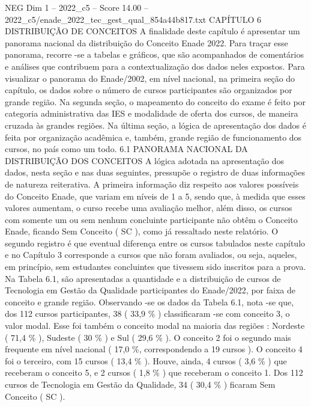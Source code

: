 \begin{textsample}{NEG Dim 1 – 2022\_c5 – Score 14.00 – 2022\_c5/enade\_2022\_tec\_gest\_qual\_854a44b817.txt}  \label{ex:f1_neg_413}
CAPÍTULO 6 DISTRIBUIÇÃO DE CONCEITOS A finalidade deste capítulo é apresentar um panorama nacional da distribuição do Conceito Enade 2022.
Para traçar esse panorama, recorre -se a tabelas e gráficos, que são acompanhados de comentários e análises que contribuem para a contextualização dos dados neles expostos.
Para visualizar o panorama do Enade/2002, em nível nacional, na primeira seção do capítulo, os dados sobre o número de cursos participantes são organizados por grande região.
Na segunda seção, o mapeamento do conceito do exame é feito por categoria administrativa das IES e modalidade de oferta dos cursos, de maneira cruzada às grandes regiões.
Na última seção, a lógica de apresentação dos dados é feita por organização acadêmica e, também, grande região de funcionamento dos cursos, no país como um todo. 6.1 PANORAMA NACIONAL DA DISTRIBUIÇÃO DOS CONCEITOS A lógica adotada na apresentação dos dados, nesta seção e nas duas seguintes, pressupõe o registro de duas informações de natureza reiterativa.
A primeira informação diz respeito aos valores possíveis do Conceito Enade, que variam em níveis de 1 a 5, sendo que, à medida que esses valores aumentam, o curso recebe uma avaliação melhor, além disso, os cursos com somente um ou sem nenhum concluinte participante não obtêm o Conceito Enade, ficando Sem Conceito ( SC ), como já ressaltado neste relatório.
O segundo registro é que eventual diferença entre os cursos tabulados neste capítulo e no Capítulo 3 corresponde a cursos que não foram avaliados, ou seja, aqueles, em princípio, sem estudantes concluintes que tivessem sido inscritos para a prova.
Na Tabela 6.1, são apresentadas a quantidade e a distribuição de cursos de Tecnologia em Gestão da Qualidade participantes do Enade/2022, por faixa de conceito e grande região.
Observando -se os dados da Tabela 6.1, nota -se que, dos 112 cursos participantes, 38 ( 33,9 \% ) classificaram -se com conceito 3, o valor modal.
Esse foi também o conceito modal na maioria das regiões : Nordeste ( 71,4 \% ), Sudeste ( 30 \% ) e Sul ( 29,6 \% ).
O conceito 2 foi o segundo mais frequente em nível nacional ( 17,0 \%, correspondendo a 19 cursos ).
O conceito 4 foi o terceiro, com 15 cursos ( 13,4 \% ).
Houve, ainda, 4 cursos ( 3,6 \% ) que receberam o conceito 5, e 2 cursos ( 1,8 \% ) que receberam o conceito 1.
Dos 112 cursos de Tecnologia em Gestão da Qualidade, 34 ( 30,4 \% ) ficaram Sem Conceito ( SC ).

\end{textsample}

